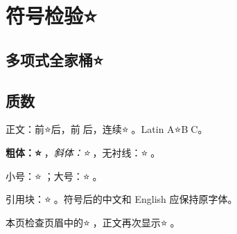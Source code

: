 \documentclass{article}
\begin{document}
\tableofcontents
\section{符号检验⭐🚩}
\subsection{多项式全家桶⭐}
\subsection{质数🚩}
正文：前⭐后，前🚩后，连续⭐🚩。Latin A⭐B🚩C。

\textbf{粗体：⭐🚩}，\textit{斜体：⭐🚩}，\textsf{无衬线：⭐🚩}。

{\small 小号：⭐🚩}；{\fontsize{22}{28}\selectfont 大号：⭐🚩}。

\begin{quoteblock}
引用块：⭐🚩。符号后的中文和 English 应保持原字体。
\end{quoteblock}
\newpage
本页检查页眉中的⭐🚩，正文再次显示⭐🚩。
\end{document}
